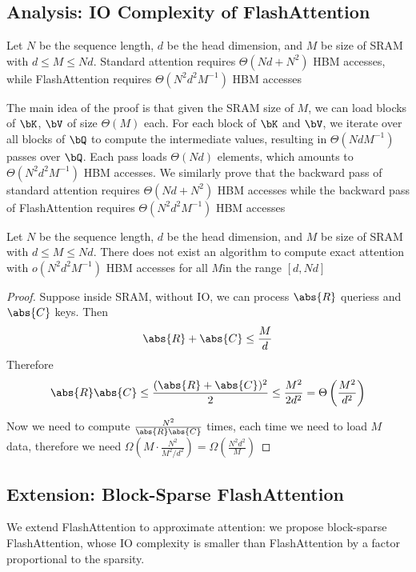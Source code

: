 \documentclass[11pt]{article}
\begin{document}
\subsection{Analysis: IO Complexity of FlashAttention}
\label{sec:org3574e78}
\begin{theorem}[]
Let \(N\) be the sequence length, \(d\) be the head dimension, and \(M\) be size of SRAM with
\(d\le M\le Nd\). Standard attention requires \(\Theta(Nd+N^2)\) HBM accesses, while FlashAttention
requires \(\Theta(N^2d^2M^{-1})\) HBM accesses
\end{theorem}

The main idea of the proof is that given the SRAM size of \(M\), we can load blocks of \(\bK\),
\(\bV\) of size \(\Theta(M)\) each. For each block of \(\bK\) and \(\bV\), we iterate over all blocks
of \(\bQ\) to compute the intermediate values, resulting in \(\Theta(NdM^{-1})\) passes over \(\bQ\).
Each pass loads \(\Theta(Nd)\) elements, which amounts to \(\Theta(N^2d^2M^{-1})\) HBM accesses. We
similarly prove that the backward pass of standard attention requires \(\Theta(Nd+N^2)\) HBM accesses
while the backward pass of FlashAttention requires \(\Theta(N^2d^2M^{-1})\) HBM accesses

\begin{proposition}[]
Let \(N\) be the sequence length, \(d\) be the head dimension, and \(M\) be size of SRAM with
\(d\le M\le Nd\). There does not exist an algorithm to compute exact attention with
\(o(N^2d^2M^{-1})\) HBM accesses for all \(M\)in the range \([d,Nd]\)
\end{proposition}

\begin{proof}
Suppose inside SRAM, without IO, we can process \(\abs{R}\) queriess and \(\abs{C}\) keys. Then
\begin{equation*}
\abs{R}+\abs{C}\le\frac{M}{d}
\end{equation*}
Therefore
\begin{equation*}
\abs{R}\abs{C}\le\frac{(\abs{R}+\abs{C})^2}{2}\le\frac{M^2}{2d^2}=\Theta\left(\frac{M^2}{d^2}\right)
\end{equation*}


Now we need to compute \(\frac{N^2}{\abs{R}\abs{C}}\) times, each time we need to load \(M\) data,
therefore we need
\(\Omega(M\cdot\frac{N^2}{M^2/d^2})=\Omega(\frac{N^2d^2}{M})\)
\end{proof}
\subsection{Extension: Block-Sparse FlashAttention}
\label{sec:org438ccd6}
We extend FlashAttention to approximate attention: we propose block-sparse FlashAttention, whose IO
complexity is smaller than FlashAttention by a factor proportional to the sparsity.
\end{document}
